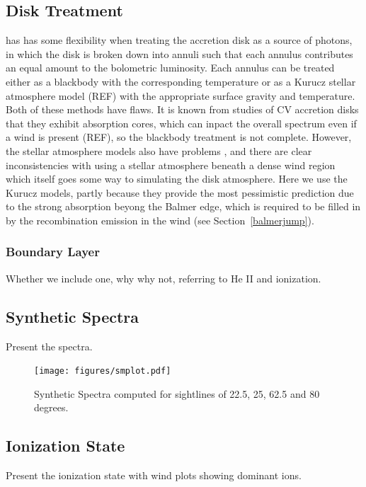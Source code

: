 \documentclass[useAMS,usenatbib, onecolumn]{mn2ejm}
\begin{document}
\subsection{Disk Treatment}
\py has has some flexibility when treating the accretion disk as a source of photons, in which the disk is broken down into annuli 
such that each annulus contributes an equal amount to the bolometric luminosity. Each annulus can 
be treated either as a blackbody with the corresponding temperature or as a Kurucz stellar atmosphere model (REF)
with the appropriate surface gravity and temperature. Both of these methods have flaws. It is known
from studies of CV accretion disks that they exhibit absorption cores, which can inpact the overall spectrum 
even if a wind is present (REF), so the blackbody treatment is not complete. However, the stellar atmosphere
models also have problems \cite{wadedisk}, and there are clear inconsistencies with using a stellar atmosphere beneath a dense
wind region which itself goes some way to simulating the disk atmosphere. Here we use the Kurucz models,
partly because they provide the most pessimistic prediction due to the strong absorption beyong the Balmer edge, 
which is required to be filled in by the recombination emission in the wind (see Section~\ref{balmerjump}).

\subsubsection{Boundary Layer}
Whether we include one, why why not, referring to He II and ionization.

\subsection{Synthetic Spectra}
Present the spectra.

\begin{figure}
\texttt{[image: figures/smplot.pdf]}
\caption{Synthetic Spectra computed for sightlines of 22.5, 25, 62.5 and 80 degrees.}
\end{figure}

\subsection{Ionization State}
Present the ionization state with wind plots showing dominant ions.


%
%
\end{document}
